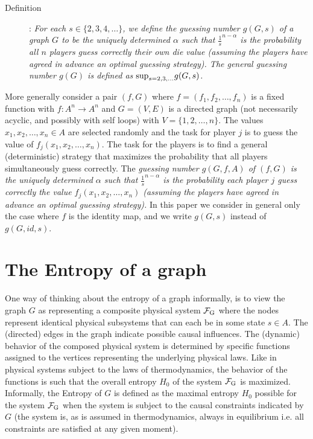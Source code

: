\documentclass[12pt]{article}
\begin{document}
\begin{description}

\item [Definition]: 
\it 
\noindent
For each $s \in \{2,3,4, \ldots\}$, we define the guessing number $g(G,s)$ of a graph $G$ to be the uniquely determined $\alpha$ such that $\frac{1}{s}^{n-\alpha}$ is the probability all $n$ players guess correctly their own die value (assuming the players have agreed in advance an optimal guessing strategy). The general guessing number $g(G)$ is defined as ${\rm sup}_{s=2,3,...} g(G,s)$.
\rm
\end{description}

More generally consider a pair $(f,G)$ where $f=(f_1,f_2, \ldots,f_n)$ is a fixed function with $f:A^n \rightarrow A^n$ and $G=(V,E)$ is a directed graph (not necessarily acyclic, and possibly with self loops) with $V=\{1,2,\ldots,n\}$. The values $x_1,x_2, \ldots,x_n \in A$ are selected randomly and the task for player $j$ is to guess the value of $f_j(x_1,x_2, \ldots,x_n)$. The task for the players is to find a general (deterministic) strategy that maximizes the probability that all players simultaneously guess correctly.  The {\it guessing number $g(G,f,A)$ of $(f,G)$ is the uniquely determined $\alpha$ such that $\frac{1}{s}^{n-\alpha}$ is the probability each player $j$ guess correctly the value
$f_j(x_1,x_2, \ldots,x_n)$ (assuming the players have agreed in advance an optimal guessing strategy).}
In this paper we consider in general  only the case where $f$ is the identity map, and we 
write $g(G,s)$ instead of $g(G,id,s)$.

\section{The Entropy of a graph}
\rm 
One way of thinking about the entropy of a graph informally, is to view the graph $G$ as representing a composite physical system $\cal{F}_{\rm G}$ where the nodes represent identical physical subsystems that can each be in some state $s \in A$. The (directed) edges in the graph indicate possible causal influences. The (dynamic) behavior of the composed physical system is determined by specific functions assigned to the vertices representing the underlying physical laws. Like in physical systems subject to the laws of thermodynamics, the behavior of the functions is such that the overall entropy $H_0$ of the system $\cal{F}_{\rm G}$ is maximized. Informally, the Entropy of $G$ is defined as the maximal entropy $H_0$ possible for the system $\cal{F}_{\rm G}$ when the system is subject to the causal constraints indicated by $G$ (the system is, as is assumed in thermodynamics, always in equilibrium i.e. all constraints are satisfied at any given moment).  
\end{document}
